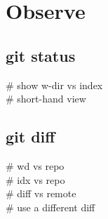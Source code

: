 \section{Observe}

\subsection*{git status}
 \# show w-dir vs index \\
 \# short-hand view 


\subsection*{git diff}
 \# wd vs repo \\
 \# idx vs repo \\
 \# diff vs remote \\
 \# use a different diff


